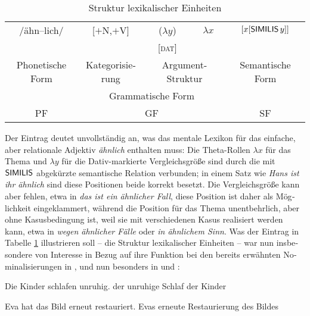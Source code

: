 \documentclass[output=paper,colorlinks,citecolor=brown]{langscibook}
\begin{document}
\begin{otherlanguage}{german}
\begin{table}[ht]
    \centering
    \begin{tabular}{ccccc}
       /ähn--lich/  &  [$+$N,$+$V] & ($\lambda y$) & $\lambda x$ & $[x [ \cnst{similis}\, y ]]$ \\
        &  & {\small [\textsc{dat}]} & & \\
       Phonetische Form & Kategorisierung & \multicolumn{2}{c}{Argument-Struktur} & Semantische Form \\
       & \multicolumn{3}{c}{Grammatische Form} & \\
       PF & \multicolumn{3}{c}{GF} & SF \\
    \end{tabular}
    \caption{Struktur lexikalischer Einheiten}
    \label{tab:entry}
\end{table}

Der Eintrag deutet unvollständig an, was das mentale Lexikon für das einfache, aber relationale Adjektiv \textit{ähnlich} enthalten muss: Die Theta-Rollen $\lambda x$ %
für das Thema und $\lambda y$ %
für die Dativ-markierte Vergleichsgröße sind durch die mit $\cnst{similis}$ abgekürzte semantische Relation verbunden; in einem Satz wie \textit{Hans ist ihr ähnlich} sind diese Positionen beide korrekt besetzt. Die Vergleichsgröße kann aber fehlen, etwa in \textit{das ist ein ähnlicher Fall}, diese Position ist daher als Möglichkeit eingeklammert, während die Position für das Thema unentbehrlich, aber ohne Kasusbedingung ist, weil sie mit verschiedenen Kasus realisiert werden kann, etwa in \textit{wegen ähnlicher Fälle} oder \textit{in ähnlichem Sinn}. Was der Eintrag in Tabelle \ref{tab:entry} illustrieren soll -- die Struktur lexikalischer Einheiten -- war nun insbesondere von Interesse in Bezug auf ihre Funktion bei den bereits erwähnten Nominalisierungen in ,  und nun besonders in  und :

\ea 
\ea Die Kinder schlafen unruhig. 
\ex der unruhige Schlaf der Kinder
\z
\label{ex:11}
\z

\ea 
\ea Eva hat das Bild erneut restauriert.
\ex Evas erneute Restaurierung des Bildes
\z
\label{ex:12}
\z


\end{otherlanguage}
\end{document}
